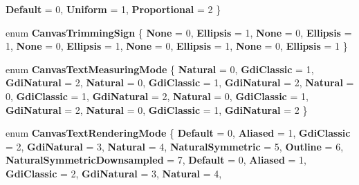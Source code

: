 \begin{DoxyCompactItemize}
{\bfseries Default} = 0, 
{\bfseries Uniform} = 1, 
{\bfseries Proportional} = 2
 \}
\item 
\mbox{\label{namespace_microsoft_1_1_graphics_1_1_canvas_1_1_text_a891e2d3429f4e8717d79bdd171ed64a0}} 
enum {\bfseries Canvas\+Trimming\+Sign} \{ \newline
{\bfseries None} = 0, 
{\bfseries Ellipsis} = 1, 
{\bfseries None} = 0, 
{\bfseries Ellipsis} = 1, 
\newline
{\bfseries None} = 0, 
{\bfseries Ellipsis} = 1, 
{\bfseries None} = 0, 
{\bfseries Ellipsis} = 1, 
\newline
{\bfseries None} = 0, 
{\bfseries Ellipsis} = 1
 \}
\item 
\mbox{\label{namespace_microsoft_1_1_graphics_1_1_canvas_1_1_text_a3496181b6d55fc9dc4eeaff916dc841f}} 
enum {\bfseries Canvas\+Text\+Measuring\+Mode} \{ \newline
{\bfseries Natural} = 0, 
{\bfseries Gdi\+Classic} = 1, 
{\bfseries Gdi\+Natural} = 2, 
{\bfseries Natural} = 0, 
\newline
{\bfseries Gdi\+Classic} = 1, 
{\bfseries Gdi\+Natural} = 2, 
{\bfseries Natural} = 0, 
{\bfseries Gdi\+Classic} = 1, 
\newline
{\bfseries Gdi\+Natural} = 2, 
{\bfseries Natural} = 0, 
{\bfseries Gdi\+Classic} = 1, 
{\bfseries Gdi\+Natural} = 2, 
\newline
{\bfseries Natural} = 0, 
{\bfseries Gdi\+Classic} = 1, 
{\bfseries Gdi\+Natural} = 2
 \}
\item 
\mbox{\label{namespace_microsoft_1_1_graphics_1_1_canvas_1_1_text_a334e63f588579a4be3880313d6dabd2d}} 
enum {\bfseries Canvas\+Text\+Rendering\+Mode} \{ \newline
{\bfseries Default} = 0, 
{\bfseries Aliased} = 1, 
{\bfseries Gdi\+Classic} = 2, 
{\bfseries Gdi\+Natural} = 3, 
\newline
{\bfseries Natural} = 4, 
{\bfseries Natural\+Symmetric} = 5, 
{\bfseries Outline} = 6, 
{\bfseries Natural\+Symmetric\+Downsampled} = 7, 
\newline
{\bfseries Default} = 0, 
{\bfseries Aliased} = 1, 
{\bfseries Gdi\+Classic} = 2, 
{\bfseries Gdi\+Natural} = 3, 
\newline
{\bfseries Natural} = 4, 

\end{DoxyCompactItemize}
